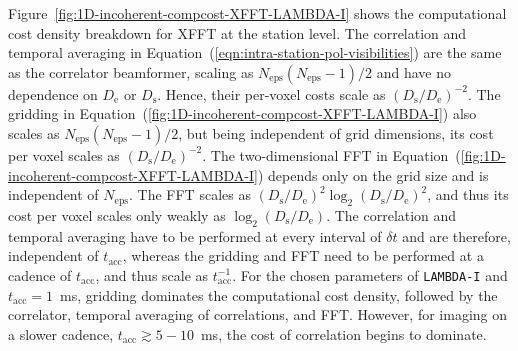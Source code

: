 \documentclass[
  journal=pasa,
  manuscript=article-type,
  year=2020,
  volume=37,
]{cup-journal}
\begin{document}


Figure~\ref{fig:1D-incoherent-compcost-XFFT-LAMBDA-I} shows the computational cost density breakdown for XFFT at the station level. The correlation and temporal averaging in Equation~(\ref{eqn:intra-station-pol-visibilities}) are the same as the correlator beamformer, scaling as $N_\textrm{eps}(N_\textrm{eps}-1)/2$ and have no dependence on $D_\textrm{e}$ or $D_\textrm{s}$. Hence, their per-voxel costs scale as $(D_\textrm{s}/D_\textrm{e})^{-2}$. The gridding in Equation~(\ref{fig:1D-incoherent-compcost-XFFT-LAMBDA-I}) also scales as $N_\textrm{eps}(N_\textrm{eps}-1)/2$, but being independent of grid dimensions, its cost per voxel scales as $(D_\textrm{s}/D_\textrm{e})^{-2}$. The two-dimensional FFT in Equation~(\ref{fig:1D-incoherent-compcost-XFFT-LAMBDA-I}) depends only on the grid size and is independent of $N_\textrm{eps}$. The FFT scales as $(D_\textrm{s}/D_\textrm{e})^2\log_2(D_\textrm{s}/D_\textrm{e})^2$, and thus its cost per voxel scales only weakly as $\log_2(D_\textrm{s}/D_\textrm{e})$. The correlation and temporal averaging have to be performed at every interval of $\delta t$ and are therefore, independent of $t_\textrm{acc}$, whereas the gridding and FFT need to be performed at a cadence of $t_\textrm{acc}$, and thus scale as $t_\textrm{acc}^{-1}$. For the chosen parameters of \texttt{LAMBDA-I} and $t_\textrm{acc}=1$~ms, gridding dominates the computational cost density, followed by the correlator, temporal averaging of correlations, and FFT. However, for imaging on a slower cadence, $t_\textrm{acc}\gtrsim 5-10$~ms, the cost of correlation begins to dominate. 
\end{document}
